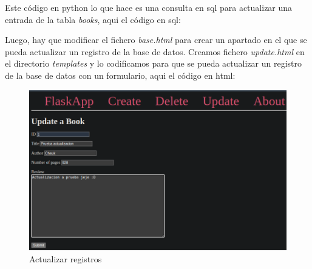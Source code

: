 \documentclass[11pt]{report}
\begin{document}
Este código en python lo que hace es una consulta en sql para actualizar una entrada de la tabla \emph{books},
aqui el código en sql:
\lstset{style=mystyle}


Luego, hay que modificar el fichero \emph{base.html} para crear un apartado en el que se pueda actualizar
un registro de la base de datos. Creamos fichero \emph{update.html} en el directorio \emph{templates} y
lo codificamos para que se pueda actualizar un registro de la base de datos con un formulario, aqui el código
en html:
\lstset{style=mystyle}


\begin{figure}[H]
  \centering
  \includegraphics[scale=0.27]{img/update_book.png}
  \caption{Actualizar registros}
\end{figure}
\end{document}

